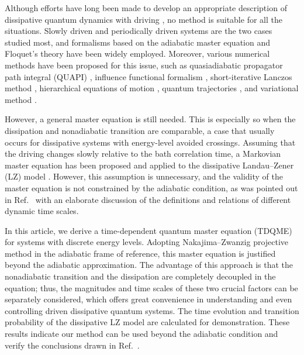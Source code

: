 \documentclass[english,nofootinbib, pra, twocolumn,superscriptaddress]{revtex4-1}
\begin{document}
Although efforts have long been made to develop an appropriate
description of dissipative quantum dynamics with driving \citep{1978.Spohn},
no method is suitable for all the situations. Slowly driven
and periodically driven systems are the two cases studied most, and
formalisms based on the adiabatic master equation \citep{1991.Wudka,2010.Pekola}
and Floquet's theory \citep{1997.Hanggi,2009.Kohn,2015.Esposito,2016.Brandes}
have been widely employed. Moreover, various numerical
methods have been proposed for this issue, such as quasiadiabatic
propagator path integral (QUAPI) \citep{2009.Thorwart}, influence
functional formalism \citep{2017.Kantorovich}, short-iterative Lanczos
method \citep{2019.Filippis}, hierarchical equations of motion \citep{2016.Gong},
quantum trajectories \citep{2018.Lidar}, and variational method \citep{2018.Zhao,2018.Giovannetti}.

However, a general master equation is still needed. This is especially so
when the dissipation and nonadiabatic transition are comparable, a
case that usually occurs for dissipative systems with energy-level avoided
crossings. Assuming that the driving changes slowly
relative to the bath correlation time, a Markovian master equation
has been proposed and applied to the dissipative Landau--Zener (LZ) model
\citep{2014.Nalbach}. However, this assumption is unnecessary, and
the validity of the master equation is not constrained by the adiabatic
condition, as was pointed out in Ref.~\citep{2017.Ogawa} with an elaborate
discussion of the definitions and relations of different dynamic time scales.

In this article, we derive a time-dependent quantum master equation
(TDQME) for systems with discrete energy levels. Adopting Nakajima--Zwanzig projective method \citep{2007.Petruccione}
in the adiabatic frame of reference, this master equation is justified
beyond the adiabatic approximation. The advantage of this approach is
that the nonadiabatic transition and the dissipation are completely
decoupled in the equation; thus, the magnitudes and time scales
of these two crucial factors can be separately considered, which offers great convenience in understanding and even controlling driven dissipative quantum systems. The time evolution and transition probability of the dissipative LZ model are
calculated for demonstration. These results indicate our method can be used beyond the adiabatic condition and verify the conclusions drawn in Ref.~\citep{2017.Ogawa}. 
\end{document}
